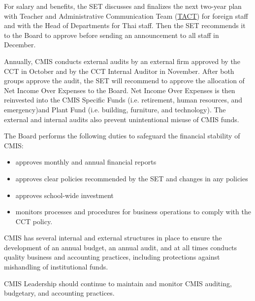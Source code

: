 \begin{findings}
For salary and benefits, the SET discusses and finalizes the next two-year plan with Teacher and Administrative  Communication Team (\href{https://docs.google.com/document/d/14nhwcw8xo3i-23Q-WUxo6KJ_c8yFKu-jTdCctt4MFcs/edit}{TACT}) for foreign staff and with the Head of Departments for Thai staff. Then the SET recommends it to the Board to approve before sending an announcement to all staff in December.


Annually, CMIS conducts external audits by an external firm approved by the CCT in October and by the CCT Internal Auditor in November. After both groups approve the audit, the SET will recommend to approve the allocation of Net Income Over Expenses to the Board. Net Income Over Expenses is then reinvested into the CMIS Specific Funds (i.e. retirement, human resources, and emergency)and Plant Fund (i.e. building, furniture, and technology). The external and internal audits also prevent unintentional misuse of CMIS funds. 


The Board performs the following duties to safeguard the financial stability of CMIS:
\begin{itemize}
\item approves monthly and annual financial reports 
\item approves clear policies recommended by the SET and changes in any policies
\item approves school-wide investment
\item monitors processes and procedures for business operations to comply with the CCT policy.
\end{itemize}


CMIS has several internal and external structures in place to ensure the development of an annual budget, an annual audit, and at all times conducts quality business and accounting practices, including protections against mishandling of institutional funds.

CMIS Leadership should continue to maintain and monitor CMIS auditing, budgetary, and accounting practices. 
\end{findings}
